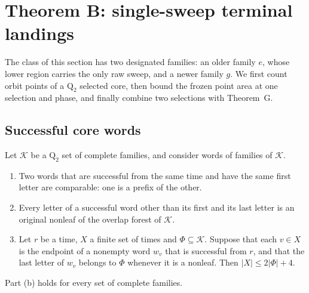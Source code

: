 \section{Theorem B: single-sweep terminal landings}\label{sec:terminal-landings}

The class of this section has two designated families: an older family $e$, whose
lower region carries the only raw sweep, and a newer family $g$. We first count orbit
points of a $\mathrm Q_2$ selected core, then bound the frozen point area at one
selection and phase, and finally combine two selections with Theorem~G.

\subsection{Successful core words}

\begin{lemma}\label{lem:core-words}
Let $\mathcal K$ be a $\mathrm Q_2$ set of complete families, and consider words of
families of $\mathcal K$.
\begin{enumerate}[label=(\alph*)]
\item Two words that are successful from the same time and have the same first letter
are comparable: one is a prefix of the other.
\item Every letter of a successful word other than its first and its last letter is
an original nonleaf of the overlap forest of $\mathcal K$.
\item Let $r$ be a time, $X$ a finite set of times and $\Phi\subseteq\mathcal K$.
Suppose that each $v\in X$ is the endpoint of a nonempty word $w_v$ that is
successful from $r$, and that the last letter of $w_v$ belongs to $\Phi$ whenever it is
a nonleaf. Then $|X|\le2|\Phi|+4$.
\end{enumerate}
Part (b) holds for every set of complete families.
\end{lemma}

